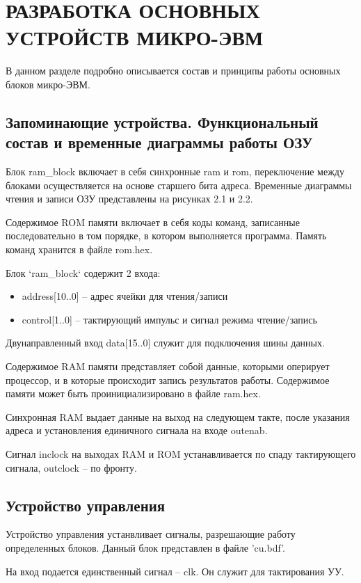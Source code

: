 \lstset{style=fsharpstyle}

\section{РАЗРАБОТКА ОСНОВНЫХ УСТРОЙСТВ МИКРО-ЭВМ}
\label{sec:practice:technology_used}

В данном разделе подробно описывается состав и принципы работы основных блоков микро-ЭВМ.

\subsection{Запоминающие устройства. Функциональный состав и временные диаграммы работы ОЗУ}
Блок ram\_block включает в себя синхронные ram и rom, переключение между блоками осуществляется на основе старшего бита адреса.
Временные диаграммы чтения и записи ОЗУ представлены на рисунках 2.1 и 2.2.

Содержимое ROM памяти включает в себя коды команд, записанные последовательно в том порядке, в котором выполняется программа.
Память команд хранится в файле rom.hex.

Блок `ram\_block` содержит 2 входа:
\begin{itemize}
    \item address[10..0] -- адрес ячейки для чтения/записи
    \item control[1..0] -- тактирующий импульс и сигнал режима чтение/запись
\end{itemize}
Двунаправленный вход data[15..0] служит для подключения шины данных.

Содержимое RAM памяти представляет собой данные, которыми оперирует процессор, и в которые происходит запись результатов работы. Содержимое памяти может быть проинициализировано в файле ram.hex.

Синхронная RAM выдает данные на выход на следующем такте, после указания адреса и установления единичного сигнала на входе outenab.

Сигнал inclock на выходах RAM и ROM устанавливается по спаду тактирующего сигнала, outclock -- по фронту.
\subsection{Устройство управления}
Устройство управления устанвливает сигналы, разрешающие работу определенных блоков.
Данный блок представлен в файле 'cu.bdf'.

На вход подается единственный сигнал -- clk. Он служит для тактирования УУ.

